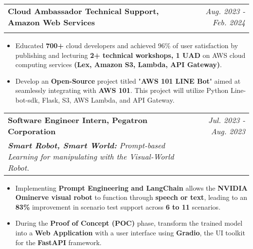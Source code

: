 \documentclass[a4paper,11pt]{article}
\makeatletter
\newcommand{\resumeSubheading}[4]{
\vspace{0.5mm}\item
    \begin{tabular*}{0.98\textwidth}[t]{l@{\extracolsep{\fill}}r}
        \textbf{#1} & \textit{\footnotesize{#4}} \\
        \textit{\footnotesize{#3}} &  \footnotesize{#2}\\
    \end{tabular*}
    \vspace{-2.4mm}
}
\newcommand{\resumeItemListStart}{\begin{justify}\begin{itemize}[
    leftmargin=3ex, 
    rightmargin=2ex, 
    noitemsep,
    labelsep=1.2mm,
    itemsep=0.5mm
    ]\small
}
\newcommand{\resumeItemListEnd}{\end{itemize}\end{justify}\vspace{-2mm}}
\makeatother
\begin{document}
        \vspace{-2.0mm}

        \resumeSubheading
            { Cloud Ambassador Technical Support, Amazon Web Services 
            }
            {}
            {}
            {Aug. 2023 - Feb. 2024}

            \vspace{-6.0mm}

            \resumeItemListStart
                \item {Educated \textbf{700+} cloud developers and achieved 96\% of user satisfaction by publishing and lecturing \textbf{2+ technical workshops, 1 UAD} on AWS cloud computing services \textbf{(Lex, Amazon S3, Lambda, API Gateway)}.}
                \item {Develop an \textbf{Open-Source} project titled "\textbf{AWS 101 LINE Bot}" aimed at seamlessly integrating with \textbf{AWS 101}. This project will utilize Python Line-bot-sdk, Flask, S3, AWS Lambda, and API Gateway.}
            \resumeItemListEnd

        \vspace{-2.0mm}

        \resumeSubheading
            { Software Engineer Intern, Pegatron Corporation 
            }
            {}
            {\textbf{Smart Robot, Smart World:} Prompt-based Learning for manipulating with the Visual-World Robot.}
            {Jul. 2023 - Aug. 2023}

            \vspace{-1.0mm}

            \resumeItemListStart
                \item {Implementing \textbf{Prompt Engineering and LangChain} allows the \textbf{NVIDIA Ominerve visual robot} to function through \textbf{speech or text}, leading to an \textbf{83\%} improvement in scenario test support across \textbf{6 to 11} scenarios.}
                \item {During the \textbf{Proof of Concept (POC)} phase, transform the trained model into a \textbf{Web Application} with a user interface using \textbf{Gradio}, the UI toolkit for the \textbf{FastAPI} framework.}
            \resumeItemListEnd
\end{document}
